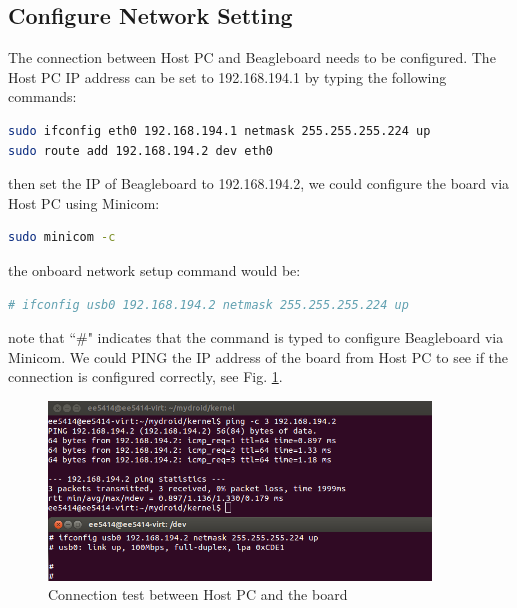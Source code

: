 \documentclass[10pt,journal,draftclsnofoot,onecolumn]{IEEEtran}
\begin{document}
    \subsection{Configure Network Setting}
The connection between Host PC and Beagleboard needs to be configured. The Host PC IP address can be set to 192.168.194.1 by typing the following commands:
\begin{lstlisting}[language={bash}]
sudo ifconfig eth0 192.168.194.1 netmask 255.255.255.224 up
sudo route add 192.168.194.2 dev eth0
\end{lstlisting}
then set the IP of Beagleboard to 192.168.194.2, we could configure the board via Host PC using Minicom:
\begin{lstlisting}[language={bash}]
sudo minicom -c
\end{lstlisting}
the onboard network setup command would be:
\begin{lstlisting}[language={bash}]
# ifconfig usb0 192.168.194.2 netmask 255.255.255.224 up
\end{lstlisting}
note that ``\#" indicates that the command is typed to configure Beagleboard via Minicom. We could PING the IP address of the board from Host PC to see if the connection is configured correctly, see Fig. \ref{lab1}.
\begin{figure}[ht]
    \centering
    \includegraphics[width=4in]{./figs/lab1.png}
    \caption{Connection test between Host PC and the board}
    \label{lab1}
\end{figure}
\end{document}
